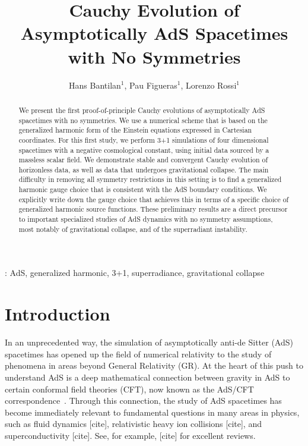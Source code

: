\documentclass[12pt]{iopart}
\begin{document}
\title[]{Cauchy Evolution of Asymptotically AdS Spacetimes with No Symmetries}

\author{Hans Bantilan$^1$, Pau Figueras$^1$, Lorenzo Rossi$^1$}
\address{$^1$ School of Mathematical Sciences, Queen Mary University of
  London, \\ Mile End Road, London E1 4NS, United Kingdom}

\begin{abstract}
We present the first proof-of-principle Cauchy evolutions of asymptotically AdS spacetimes with no symmetries.
We use a numerical scheme that is based on the generalized harmonic form of the Einstein equations expressed in Cartesian coordinates.
For this first study, we perform 3+1 simulations of four dimensional spacetimes with a negative cosmological constant, using initial data sourced by a massless scalar field.
We demonstrate stable and convergent Cauchy evolution of horizonless data, as well as data that undergoes gravitational collapse.
The main difficulty in removing all symmetry restrictions in this setting is to find a generalized harmonic gauge choice that is consistent with the AdS boundary conditions.
We explicitly write down the gauge choice that achieves this in terms of a specific choice of generalized harmonic source functions.
These preliminary results are a direct precursor to important specialized studies of AdS dynamics with no symmetry assumptions, most notably of gravitational collapse, and of the superradiant instability.
\end{abstract}


: AdS, generalized harmonic, 3+1, superradiance, gravitational collapse

%
% 




\section{Introduction}

In an unprecedented way, the simulation of asymptotically anti-de Sitter (AdS) spacetimes has opened up the field of numerical relativity to the study of phenomena in areas beyond General Relativity (GR). 
At the heart of this push to understand AdS is a deep mathematical connection between gravity in AdS to certain conformal field theories (CFT), now known as the AdS/CFT correspondence~\cite{Maldacena:1997re,Gubser:1998bc,Witten:1998qj}. 
Through this connection, the study of AdS spacetimes has become immediately relevant to fundamental questions in many areas in physics, such as fluid dynamics [cite], relativistic heavy ion collisions [cite], and superconductivity [cite].
See, for example, [cite] for excellent reviews. 
\end{document}
